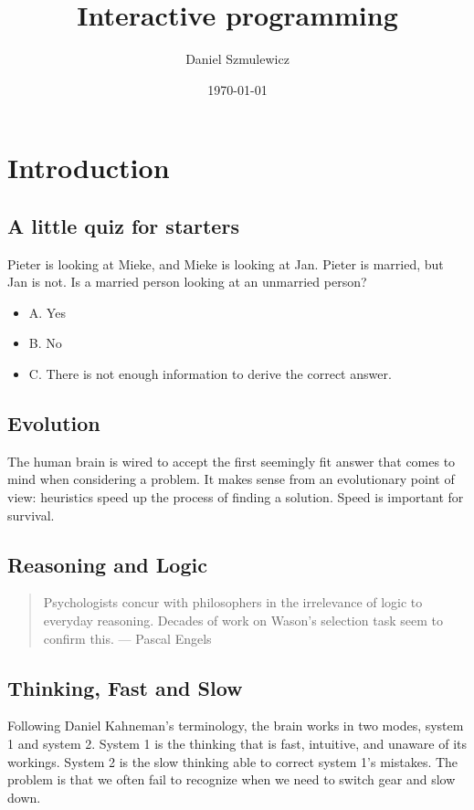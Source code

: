 \documentclass[11pt]{article}
\author{Daniel Szmulewicz}
\date{\today}
\title{Interactive programming}
\begin{document}
\maketitle

\section*{Introduction}
\label{sec:orgheadline18}
\subsection*{A little quiz for starters}
\label{sec:orgheadline1}
Pieter is looking at Mieke, and Mieke is looking at Jan. Pieter is married, but Jan is not. Is a married person looking at an unmarried person?
\begin{itemize}
\item A. Yes
\item B. No
\item C. There is not enough information to derive the correct answer.
\end{itemize}
\subsection*{Evolution}
\label{sec:orgheadline2}
The human brain is wired to accept the first seemingly fit answer that comes to mind when considering a problem.
It makes sense from an evolutionary point of view: heuristics speed up the process of finding a solution. Speed is important for survival.
\subsection*{Reasoning and Logic}
\label{sec:orgheadline3}
\begin{quote}
Psychologists concur with philosophers in the irrelevance of logic to everyday reasoning. Decades of work on Wason’s selection task seem to confirm this. — Pascal Engels
\end{quote}
\subsection*{Thinking, Fast and Slow}
\label{sec:orgheadline4}
Following Daniel Kahneman’s terminology, the brain works in two modes, system 1 and system 2. System 1 is the thinking that is fast, intuitive, and unaware of its workings. System 2 is the slow thinking able to correct system 1’s mistakes. The problem is that we often fail to recognize when we need to switch gear and slow down. 
\end{document}
